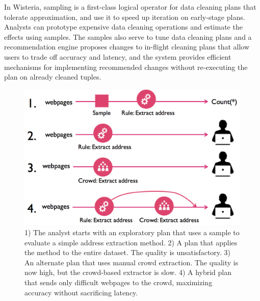 In Wisteria, sampling is a first-class logical operator for data cleaning plans that tolerate approximation, and use it to speed up iteration on early-stage plans.
Analysts can prototype expensive data cleaning operations and estimate the effects using samples.
The samples also serve to tune data cleaning plans and a recommendation engine proposes changes to in-flight cleaning plans that allow users to trade off accuracy and latency, and the system provides efficient mechanisms for implementing recommended changes without re-executing the plan on already cleaned tuples.

\begin{figure}
\includegraphics[width = .4\textwidth]{figs/lifecycle.png}
\caption{
1) The analyst starts with an exploratory plan that uses a sample to evaluate a simple address extraction method.
2) A plan that applies the method to the entire dataset. The quality is unsatisfactory. 
3) An alternate plan that uses manual crowd extraction. The quality is now high, but the crowd-based extractor is slow. 
4) A hybrid plan that sends only difficult webpages to the crowd, maximizing accuracy without sacrificing latency. }
\label{fig:ex-plan}
\end{figure}



